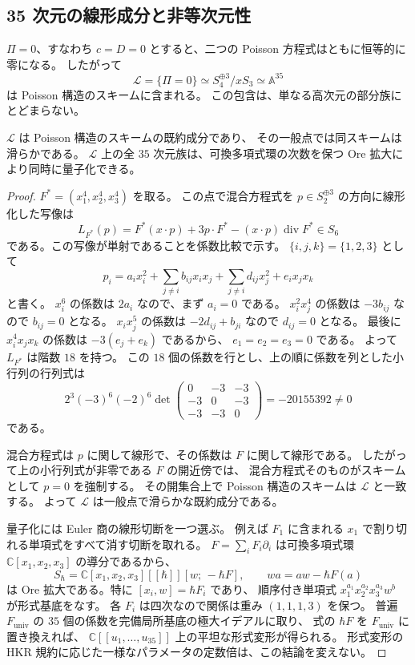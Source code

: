 \subsection{35 次元の線形成分と非等次元性}
\label{subsec:vertical-component-v31}

$\Pi=0$、すなわち $c=D=0$ とすると、二つの Poisson 方程式はともに恒等的に零になる。
したがって
\[
 \mathcal L=\{\Pi=0\}
 \simeq S_4^{\oplus3}/xS_3\simeq\mathbb A^{35}
\]
は Poisson 構造のスキームに含まれる。
この包含は、単なる高次元の部分族にとどまらない。

\begin{theorem}[垂直な線形成分]
\label{thm:vertical-component-v31}
$\mathcal L$ は Poisson 構造のスキームの既約成分であり、
その一般点では同スキームは滑らかである。
$\mathcal L$ 上の全 $35$ 次元族は、可換多項式環の次数を保つ Ore 拡大により同時に量子化できる。
\end{theorem}

\begin{proof}
$F^*=(x_1^4,x_2^4,x_3^4)$ を取る。
この点で混合方程式を $p\in S_2^{\oplus3}$ の方向に線形化した写像は
\[
 L_{F^*}(p)
 =F^*(x\cdot p)+3p\cdot F^*-(x\cdot p)\operatorname{div}F^*
 \in S_6
\]
である。この写像が単射であることを係数比較で示す。
$\{i,j,k\}=\{1,2,3\}$ として
\[
 p_i=a_i x_i^2+
      \sum_{j\neq i}b_{ij}x_ix_j+
      \sum_{j\neq i}d_{ij}x_j^2+
      e_i x_jx_k
\]
と書く。
$x_i^6$ の係数は $2a_i$ なので、まず $a_i=0$ である。
$x_i^2x_j^4$ の係数は $-3b_{ij}$ なので $b_{ij}=0$ となる。
$x_ix_j^5$ の係数は $-2d_{ij}+b_{ji}$ なので $d_{ij}=0$ となる。
最後に $x_i^4x_jx_k$ の係数は $-3(e_j+e_k)$ であるから、
$e_1=e_2=e_3=0$ である。
よって $L_{F^*}$ は階数 $18$ を持つ。
この $18$ 個の係数を行とし、上の順に係数を列とした小行列の行列式は
\[
 2^3(-3)^6(-2)^6\det
 \begin{pmatrix}0&-3&-3\\-3&0&-3\\-3&-3&0\end{pmatrix}
 =-20155392\neq0
\]
である。

混合方程式は $p$ に関して線形で、その係数は $F$ に関して線形である。
したがって上の小行列式が非零である $F$ の開近傍では、
混合方程式そのものがスキームとして $p=0$ を強制する。
その開集合上で Poisson 構造のスキームは $\mathcal L$ と一致する。
よって $\mathcal L$ は一般点で滑らかな既約成分である。

量子化には Euler 商の線形切断を一つ選ぶ。
例えば $F_1$ に含まれる $x_1$ で割り切れる単項式をすべて消す切断を取れる。
$F=\sum_iF_i\partial_i$ は可換多項式環 $\mathbb C[x_1,x_2,x_3]$ の導分であるから、
\[
 S_\hbar=\mathbb C[x_1,x_2,x_3][[\hbar]]
 [w;\,-\hbar F],\qquad
 wa=aw-\hbar F(a)
\]
は Ore 拡大である。特に $[x_i,w]=\hbar F_i$ であり、
順序付き単項式 $x_1^{a_1}x_2^{a_2}x_3^{a_3}w^b$ が形式基底をなす。
各 $F_i$ は四次なので関係は重み $(1,1,1,3)$ を保つ。
普遍 $F_{\mathrm{univ}}$ の $35$ 個の係数を完備局所基底の極大イデアルに取り、
式の $\hbar F$ を $F_{\mathrm{univ}}$ に置き換えれば、
$\mathbb C[[u_1,\ldots,u_{35}]]$ 上の平坦な形式変形が得られる。
形式変形の HKR 規約に応じた一様なパラメータの定数倍は、この結論を変えない。
\end{proof}

